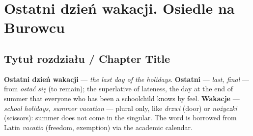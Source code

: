 %
%
%
%
%
%
%
%


\chapter{Ostatni dzień wakacji. Osiedle na Burowcu}

\section{Tytuł rozdziału / Chapter Title}


\textbf{Ostatni dzień wakacji} --- \textit{the last day of
the holidays}. \textbf{Ostatni} --- \textit{last, final} ---
from \textit{ostać się} (to remain); the superlative of
lateness, the day at the end of summer that everyone
who has been a schoolchild knows by feel.
\textbf{Wakacje} --- \textit{school holidays, summer
vacation} --- plural only, like \textit{drzwi} (door)
or \textit{nożyczki} (scissors): summer does not come
in the singular. The word is borrowed from Latin
\textit{vacatio} (freedom, exemption) via the academic
calendar.

